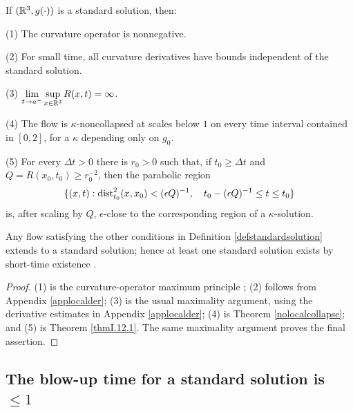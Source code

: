 \begin{lemma}
  \label{lem:kl-standard-solutions-existence-kappa-solutions}

\label{lemstandard0}
If $({\mathbb R}^3,g(\cdot))$ is a standard solution, then:

(1) The curvature operator is nonnegative.

(2) For small time, all curvature derivatives have bounds independent of the
standard solution.

(3) $\displaystyle\lim_{t\to a^-}\sup_{x\in{\mathbb R}^3}R(x,t)=\infty$.

(4) The flow is $\kappa$-noncollapsed at scales below $1$ on every time
interval contained in $[0,2]$, for a $\kappa$ depending only on $g_0$.

(5) For every $\Delta t>0$ there is $r_0>0$ such that, if $t_0\geq\Delta t$ and
$Q=R(x_0,t_0)\geq r_0^{-2}$, then the parabolic region
\[
\{(x,t):\operatorname{dist}_{t_0}^2(x,x_0)<(\epsilon Q)^{-1},\quad
t_0-(\epsilon Q)^{-1}\leq t\leq t_0\}
\]
is, after scaling by $Q$, $\epsilon$-close to the corresponding region of a
$\kappa$-solution.

Any flow satisfying the other conditions in Definition \ref{defstandardsolution}
extends to a standard solution; hence at least one standard solution exists by
short-time existence \cite[Theorem 1.1]{Shi2}.
\end{lemma}
\begin{proof}
\sketch (1) is the curvature-operator maximum principle \cite[Theorem 4.14]{Shi3};
(2) follows from Appendix \ref{applocalder}; (3) is the usual maximality
argument, using the derivative estimates in Appendix \ref{applocalder}; (4) is
Theorem \ref{nolocalcollapse}; and (5) is Theorem \ref{thmI.12.1}. The same
maximality argument proves the final assertion.
\end{proof}

\subsection{The blow-up time for a standard solution is $\leq 1$}
 \label{claim2}

